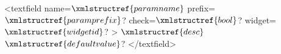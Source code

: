 <textfield name=$\xmlstructref{paramname}$
  prefix=$\xmlstructref{paramprefix}$? check=$\xmlstructref{bool}$? widget=$\xmlstructref{widgetid}$? >
  $\xmlstructref{desc}$
  $\xmlstructref{defaultvalue}$?
</textfield>
